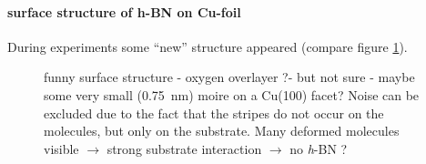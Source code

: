 \paragraph{surface structure of h-BN on Cu-foil}
During experiments some ``new'' structure appeared (compare figure \ref{fig:h-BN-stripes-cu-foil}).


\begin{figure}
 \centering
 \caption{funny surface structure - oxygen overlayer ?- but not sure - maybe some very small (\SI{0.75}{\nm}) moire on a Cu(100) facet? Noise can be excluded due to the fact that the stripes do not occur on the molecules, but only on the substrate. Many deformed molecules visible $\rightarrow$ strong substrate interaction $\rightarrow$  no \textit{h}-BN ?}
 \label{fig:h-BN-stripes-cu-foil}
\end{figure}
